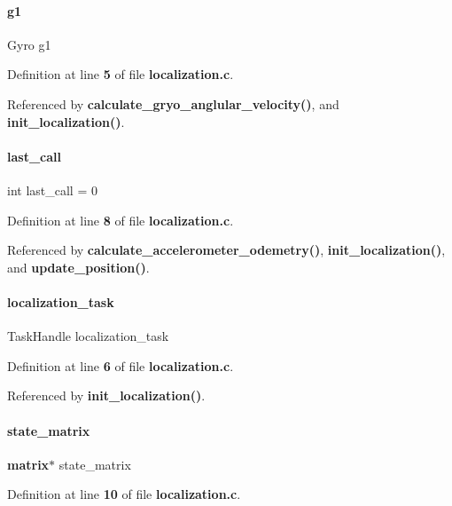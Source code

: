\paragraph{g1}
{\footnotesize\ttfamily Gyro g1\hspace{0.3cm}{\ttfamily [static]}}



Definition at line \textbf{ 5} of file \textbf{ localization.\+c}.



Referenced by \textbf{ calculate\+\_\+gryo\+\_\+anglular\+\_\+velocity()}, and \textbf{ init\+\_\+localization()}.

\mbox{\label{localization_8c_a0f327d31da83831114e7417abb7b6b63}} 
\paragraph{last\+\_\+call}
{\footnotesize\ttfamily int last\+\_\+call = 0\hspace{0.3cm}{\ttfamily [static]}}



Definition at line \textbf{ 8} of file \textbf{ localization.\+c}.



Referenced by \textbf{ calculate\+\_\+accelerometer\+\_\+odemetry()}, \textbf{ init\+\_\+localization()}, and \textbf{ update\+\_\+position()}.

\mbox{\label{localization_8c_a5be50f74f0f5a3aea13f2bd8db891488}} 
\paragraph{localization\+\_\+task}
{\footnotesize\ttfamily Task\+Handle localization\+\_\+task\hspace{0.3cm}{\ttfamily [static]}}



Definition at line \textbf{ 6} of file \textbf{ localization.\+c}.



Referenced by \textbf{ init\+\_\+localization()}.

\mbox{\label{localization_8c_a424e677cc0238390cb4a3068a6f3518c}} 
\paragraph{state\+\_\+matrix}
{\footnotesize\ttfamily \textbf{ matrix}$\ast$ state\+\_\+matrix}



Definition at line \textbf{ 10} of file \textbf{ localization.\+c}.

